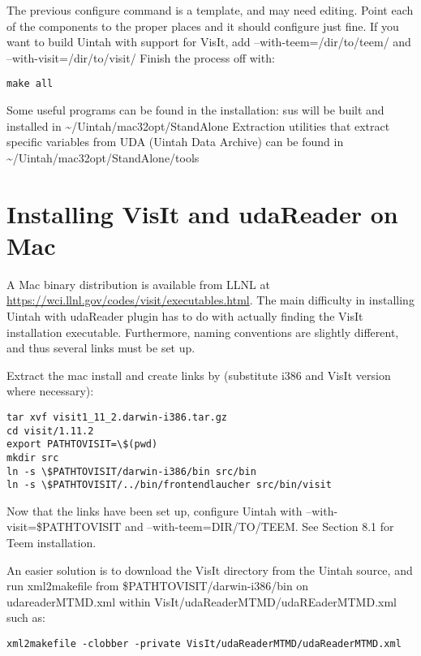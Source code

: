\documentclass[11pt,fleqn]{book} %
\begin{document}
The previous configure command is a template, and may need editing.
Point each of the components to the proper places and it should
configure just fine.  If you want to build Uintah with support for
VisIt, add --with-teem=/dir/to/teem/ and --with-visit=/dir/to/visit/
Finish the process off with:

\begin{lstlisting}
make all
\end{lstlisting}
  

Some useful programs can be found in the installation: sus will be
built and installed in \textasciitilde/Uintah/mac32opt/StandAlone
Extraction utilities that extract specific variables from UDA (Uintah
Data Archive) can be found in
\textasciitilde/Uintah/mac32opt/StandAlone/tools

\section{Installing VisIt and udaReader on Mac}

A Mac binary distribution is available from LLNL at
\url{https://wci.llnl.gov/codes/visit/executables.html}.  The main
difficulty in installing Uintah with udaReader plugin has to do with
actually finding the VisIt installation executable.  Furthermore,
naming conventions are slightly different, and thus several links must
be set up.

Extract the mac install and create links by (substitute i386 and VisIt
version where necessary):

\begin{lstlisting}
tar xvf visit1_11_2.darwin-i386.tar.gz
cd visit/1.11.2
export PATHTOVISIT=\$(pwd)
mkdir src
ln -s \$PATHTOVISIT/darwin-i386/bin src/bin
ln -s \$PATHTOVISIT/../bin/frontendlaucher src/bin/visit
\end{lstlisting}

Now that the links have been set up, configure Uintah with
--with-visit=\$PATHTOVISIT and --with-teem=DIR/TO/TEEM.  See Section
8.1 for Teem installation.

An easier solution is to download the VisIt directory from the Uintah
source, and run xml2makefile from \$PATHTOVISIT/darwin-i386/bin on
udareaderMTMD.xml within VisIt/udaReaderMTMD/udaREaderMTMD.xml such
as:

\begin{lstlisting}
xml2makefile -clobber -private VisIt/udaReaderMTMD/udaReaderMTMD.xml
\end{lstlisting}
\end{document}
